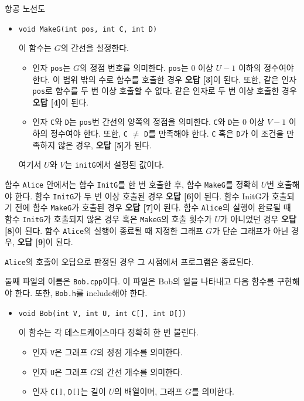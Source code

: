 \begin{problem}{항공 노선도}
\begin{itemize}
\begin{itemize}
	\item \texttt{void MakeG(int pos, int C, int D)}

	이 함수는 $G$의 간선을 설정한다.
	
	\begin{itemize}
		\item 인자 \texttt{pos}는 $G$의 정점 번호를 의미한다. \texttt{pos}는 0 이상 $U-1$ 이하의 정수여야 한다. 이 범위 밖의 수로 함수를 호출한 경우 \textbf{오답 [3]}이 된다. 또한, 같은 인자 \texttt{pos}로 함수를 두 번 이상 호출할 수 없다. 같은 인자로 두 번 이상 호출한 경우 \textbf{오답 [4]}이 된다.
		
		\item 인자 \texttt{C}와 \texttt{D}는 \texttt{pos}번 간선의 양쪽의 정점을 의미한다. \texttt{C}와 \texttt{D}는 0 이상 $V-1$ 이하의 정수여야 한다. 또한, \texttt{C} $\ne$ \texttt{D}를 만족해야 한다. \texttt{C} 혹은 \texttt{D}가 이 조건을 만족하지 않은 경우, \textbf{오답 [5]}가 된다.
		
	\end{itemize}

	여기서 $U$와 $V$는 \texttt{initG}에서 설정된 값이다.
	 
	\end{itemize}
	
	함수 \texttt{Alice} 안에서는 함수 \texttt{InitG}를 한 번 호출한 후, 함수 \texttt{MakeG}를 정확히 $U$번 호출해야 한다. 함수 \texttt{InitG}가 두 번 이상 호출된 경우 \textbf{오답 [6]}이 된다. 함수 InitG가 호출되기 전에 함수 \texttt{MakeG}가 호출된 경우 \textbf{오답 [7]}이 된다. 함수 \texttt{Alice}의 실행이 완료될 때 함수 \texttt{InitG}가 호출되지 않은 경우 혹은 \texttt{MakeG}의 호출 횟수가 $U$가 아니었던 경우 \textbf{오답 [8]}이 된다. 함수 \texttt{Alice}의 실행이 종료될 때 지정한 그래프 $G$가 단순 그래프가 아닌 경우, \textbf{오답 [9]}이 된다.
	
	\texttt{Alice}의 호출이 오답으로 판정된 경우 그 시점에서 프로그램은 종료된다.
	
\end{itemize}

둘째 파일의 이름은 \texttt{Bob.cpp}이다. 이 파일은 Bob의 일을 나타내고 다음 함수를 구현해야 한다. 또한, \texttt{Bob.h}를 include해야 한다.

\begin{itemize}
	\item \texttt{void Bob(int V, int U, int C[], int D[])}
	
	이 함수는 각 테스트케이스마다 정확히 한 번 불린다.
	
	\begin{itemize}
		\item 인자 \texttt{V}은 그래프 $G$의 정점 개수를 의미한다.
		\item 인자 \texttt{U}은 그래프 $G$의 간선 개수를 의미한다.
		\item 인자 \texttt{C[]}, \texttt{D[]}는 길이 $U$의 배열이며, 그래프 $G$를 의미한다.
	\end{itemize}
	

\end{itemize}
\end{problem}
